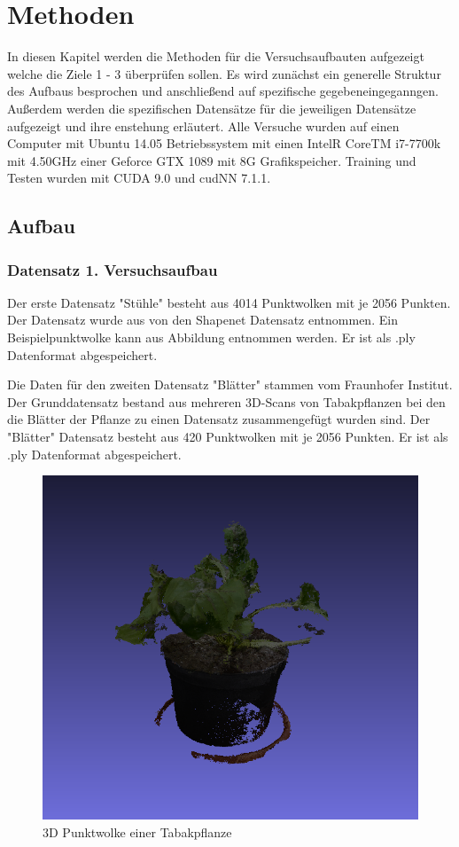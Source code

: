 \documentclass{llncs}
\begin{document}
\section{Methoden}
In diesen Kapitel werden die Methoden für die Versuchsaufbauten aufgezeigt welche die Ziele 1 - 3 überprüfen sollen. Es wird zunächst ein generelle Struktur des Aufbaus besprochen und anschließend auf spezifische gegebeneingeganngen. Außerdem werden die spezifischen Datensätze für die jeweiligen Datensätze aufgezeigt und ihre enstehung erläutert. Alle Versuche wurden auf einen Computer mit Ubuntu 14.05 Betriebssystem mit einen IntelR CoreTM i7-7700k mit 4.50GHz einer Geforce GTX 1089 mit 8G Grafikspeicher. Training und Testen wurden mit CUDA 9.0 und cudNN 7.1.1.

\subsection{Aufbau}
\subsubsection{Datensatz 1. Versuchsaufbau}
Der erste Datensatz "Stühle" besteht aus 4014 Punktwolken mit je 2056 Punkten. Der Datensatz wurde aus von den Shapenet Datensatz entnommen. Ein Beispielpunktwolke kann aus Abbildung entnommen werden. Er ist als .ply Datenformat abgespeichert. 

 Die Daten für den zweiten Datensatz "Blätter" stammen vom Fraunhofer Institut. Der Grunddatensatz bestand aus mehreren 3D-Scans von Tabakpflanzen bei den die Blätter der Pflanze zu einen Datensatz zusammengefügt wurden sind. Der "Blätter" Datensatz besteht aus 420 Punktwolken mit je 2056 Punkten. Er ist als .ply Datenformat abgespeichert.
\begin{figure}[htbp] 
	\centering
	\includegraphics[width=1.2\textwidth]{plant.png}
	\caption{3D Punktwolke einer Tabakpflanze}
	\label{fig:Bild2}
\end{figure}
\end{document}
